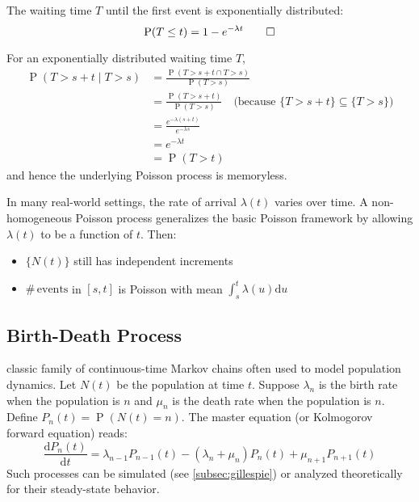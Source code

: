 \documentclass[10pt, headings=standardclasses, parskip=half, twoside]{scrartcl}
\renewcommand{\emph}[1]{\textcolor{mypurple}{#1}}
\newcommand{\dif}{\mathrm{d}}
\newcommand{\Prob}{\operatorname{P}}
\newcommand{\numof}{\ensuremath{\# \,}} %
\begin{document}
\begin{theorem}\label{thm:exp_waiting_times}
  The waiting time \(T\) until the first event is exponentially distributed:
  \[
  \Prob(T \leq t) = 1 - e^{-\lambda t} \qedhere
  \]
\end{theorem}

\begin{theorem}\label{thm:memoryless}
  For an exponentially distributed waiting time \(T\),
  \[
  \begin{aligned}
  \Prob(T > s + t \mid T > s) 
  &= \frac{\Prob(T > s + t \cap T > s)}{\Prob(T > s)} \\
  &= \frac{\Prob(T > s + t)}{\Prob(T > s)}  \quad \text{(because \(\{T> s+t\}\subseteq\{T> s\}\))} \\
  &= \frac{e^{-\lambda (s + t)}}{e^{-\lambda s}} \\
  &= e^{-\lambda t} \\ 
  &= \Prob(T > t)
  \end{aligned}
  \]
  and hence the underlying Poisson process is memoryless.
\end{theorem}

In many real-world settings, the rate of arrival \(\lambda(t)\) varies over time.
A \emph{non-homogeneous Poisson process} generalizes the basic Poisson framework by allowing \(\lambda(t)\) to be a function of \(t\).
Then:
\begin{itemize}[before={\parskip = 0em}, nosep]
  \item \(\{N(t)\}\) still has independent increments
  \item \(\numof \text{events}\) in \([s, t]\) is Poisson with mean \(\int_s^t \lambda(u) \dif u\)
\end{itemize}


\subsection{Birth-Death Process}\label{subsec:birth-death}
classic family of continuous-time Markov chains often used to model population dynamics.
Let \(N(t)\) be the population at time \(t\). 
Suppose \(\lambda_n\) is the birth rate when the population is \(n\) and \(\mu_n\) is the death rate when the population is \(n\). 
Define \(P_n(t) = \Prob(N(t)=n)\).
The \emph{master equation} (or Kolmogorov forward equation) reads:
\[
\frac{\dif P_n(t)}{\dif t} = \lambda_{n-1} P_{n-1}(t) - (\lambda_n + \mu_n) P_n(t) + \mu_{n+1} P_{n+1}(t)
\]
Such processes can be simulated (see \ref{subsec:gillespie}) or analyzed theoretically for their steady-state behavior.
\end{document}
